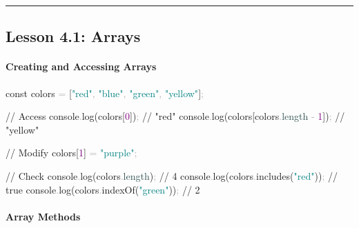\documentclass[
  justified,
  openright,
]{tufte-book}
\let\subsubsection\paragraph
\let\paragraph\paragraph
\newcommand{\AttributeTok}[1]{\textcolor{DarkSlateGray}{#1}}
\newcommand{\BuiltInTok}[1]{#1}
\newcommand{\CommentTok}[1]{\textcolor{MidGray}{#1}}
\newcommand{\DecValTok}[1]{\textcolor{Purple}{#1}}
\newcommand{\FunctionTok}[1]{\textcolor{BrandBlue}{#1}}
\newcommand{\KeywordTok}[1]{\textcolor{BrandBlue}{#1}}
\newcommand{\NormalTok}[1]{#1}
\newcommand{\OperatorTok}[1]{\textcolor{DarkGray}{#1}}
\newcommand{\StringTok}[1]{\textcolor{Teal}{#1}}
\newenvironment{Shaded}{%
  \begin{snugshade}
}{%
  \end{snugshade}
}
\let\subsubsection\paragraph
\let\paragraph\paragraph
\begin{document}
\begin{center}\rule{0.5\linewidth}{0.5pt}\end{center}

\subsection{Lesson 4.1: Arrays}\label{lesson-4.1-arrays}

\subsubsection{Creating and Accessing
Arrays}\label{creating-and-accessing-arrays}

\begin{Shaded}
\begin{Highlighting}[]
\KeywordTok{const}\NormalTok{ colors }\OperatorTok{=}\NormalTok{ [}\StringTok{"red"}\OperatorTok{,} \StringTok{"blue"}\OperatorTok{,} \StringTok{"green"}\OperatorTok{,} \StringTok{"yellow"}\NormalTok{]}\OperatorTok{;}

\CommentTok{// Access}
\BuiltInTok{console}\OperatorTok{.}\FunctionTok{log}\NormalTok{(colors[}\DecValTok{0}\NormalTok{])}\OperatorTok{;} \CommentTok{// "red"}
\BuiltInTok{console}\OperatorTok{.}\FunctionTok{log}\NormalTok{(colors[colors}\OperatorTok{.}\AttributeTok{length} \OperatorTok{{-}} \DecValTok{1}\NormalTok{])}\OperatorTok{;} \CommentTok{// "yellow"}

\CommentTok{// Modify}
\NormalTok{colors[}\DecValTok{1}\NormalTok{] }\OperatorTok{=} \StringTok{"purple"}\OperatorTok{;}

\CommentTok{// Check}
\BuiltInTok{console}\OperatorTok{.}\FunctionTok{log}\NormalTok{(colors}\OperatorTok{.}\AttributeTok{length}\NormalTok{)}\OperatorTok{;} \CommentTok{// 4}
\BuiltInTok{console}\OperatorTok{.}\FunctionTok{log}\NormalTok{(colors}\OperatorTok{.}\FunctionTok{includes}\NormalTok{(}\StringTok{"red"}\NormalTok{))}\OperatorTok{;} \CommentTok{// true}
\BuiltInTok{console}\OperatorTok{.}\FunctionTok{log}\NormalTok{(colors}\OperatorTok{.}\FunctionTok{indexOf}\NormalTok{(}\StringTok{"green"}\NormalTok{))}\OperatorTok{;} \CommentTok{// 2}
\end{Highlighting}
\end{Shaded}

\subsubsection{Array Methods}\label{array-methods}
\end{document}
